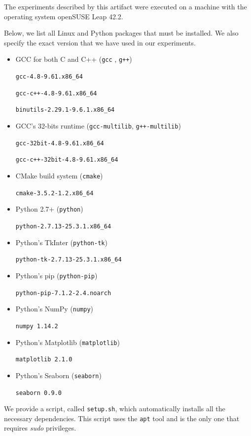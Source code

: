 {The experiments described by this artifact were executed on a machine
with the operating system openSUSE Leap 42.2.

Below, we list all Linux and Python packages that must be installed. We also specify the exact version that we have used in our experiments.

\begin{itemize}
  \item GCC for both C and C++ (\texttt{gcc} , \texttt{g++})

\texttt{gcc-4.8-9.61.x86\_64}

\texttt{gcc-c++-4.8-9.61.x86\_64}

\texttt{binutils-2.29.1-9.6.1.x86\_64}

  \item GCC's 32-bits runtime (\texttt{gcc-multilib}, \texttt{g++-multilib})

\texttt{gcc-32bit-4.8-9.61.x86\_64}

\texttt{gcc-c++-32bit-4.8-9.61.x86\_64}

  \item CMake build system (\texttt{cmake})

\texttt{cmake-3.5.2-1.2.x86\_64}

  \item Python 2.7+ (\texttt{python})

\texttt{python-2.7.13-25.3.1.x86\_64}

  \item Python's TkInter (\texttt{python-tk})

\texttt{python-tk-2.7.13-25.3.1.x86\_64}

  \item Python's pip (\texttt{python-pip})

\texttt{python-pip-7.1.2-2.4.noarch}

  \item Python's NumPy (\texttt{numpy})

\texttt{numpy 1.14.2}

  \item Python's Matplotlib (\texttt{matplotlib})

\texttt{matplotlib 2.1.0}

  \item Python's Seaborn (\texttt{seaborn})

\texttt{seaborn 0.9.0}

\end{itemize}

We provide a script, called \texttt{setup.sh}, which automatically installs
all the necessary dependencies. This script uses the \texttt{apt} tool and is the only one that requires \textit{sudo} privileges.

}

